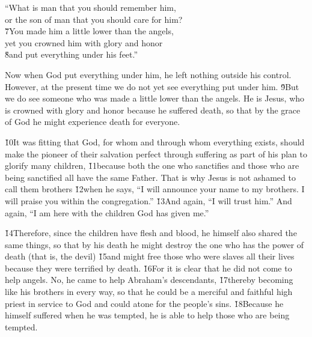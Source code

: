 \begin{poetry}
\poeml ``What is man that you should remember him, \\
\poemll    or the son of man that you should care for him? \\
\poeml \v{7}You made him a little lower than the angels, \\
\poemll    yet you crowned him with glory and honor \\
\poeml \v{8}and put everything under his feet.''
\end{poetry}

Now when God put everything under him, he left nothing outside his control. However, at the present time we do not yet see everything put under him. \v{9}But we do see someone who was made a little lower than the angels. He is Jesus, who is crowned with glory and honor because he suffered death, so that by the grace of God he might experience death for everyone.

\v{10}It was fitting that God, for whom and through whom everything exists, should make the pioneer of their salvation perfect through suffering as part of his plan to glorify many children, \v{11}because both the one who sanctifies and those who are being sanctified all have the same Father. That is why Jesus is not ashamed to call them brothers \v{12}when he says, ``I will announce your name to my brothers. I will praise you within the congregation.'' \v{13}And again, ``I will trust him.'' And again, ``I am here with the children God has given me.''

\v{14}Therefore, since the children have flesh and blood, he himself also shared the same things, so that by his death he might destroy the one who has the power of death (that is, the devil) \v{15}and might free those who were slaves all their lives because they were terrified by death. \v{16}For it is clear that he did not come to help angels. No, he came to help Abraham's descendants, \v{17}thereby becoming like his brothers in every way, so that he could be a merciful and faithful high priest in service to God and could atone for the people's sins. \v{18}Because he himself suffered when he was tempted, he is able to help those who are being tempted.

